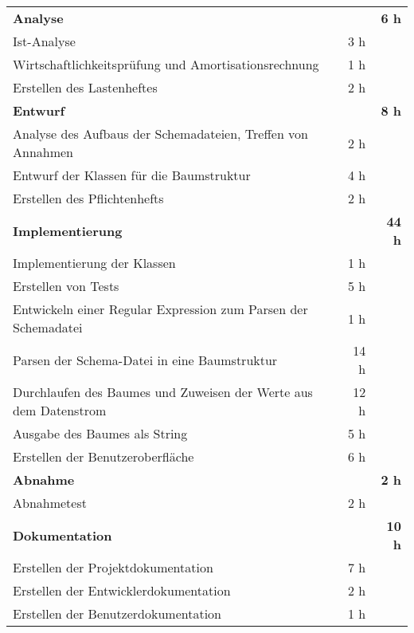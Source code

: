\begin{tabularx}{\textwidth}{Xrrr}
\rowcolor{heading}\textbf{Analyse} & \textbf{} & \textbf{} & \textbf{6 h} \\
Ist-Analyse & & 3 h\\
\rowcolor{odd}Wirtschaftlichkeitsprüfung und Amortisationsrechnung & & 1 h\\
Erstellen des Lastenheftes & & 2 h\\
\rowcolor{heading}\textbf{Entwurf} & \textbf{} & \textbf{} & \textbf{8 h} \\
Analyse des Aufbaus der Schemadateien, Treffen von Annahmen & & 2 h\\
\rowcolor{odd}Entwurf der Klassen für die Baumstruktur & & 4 h\\
Erstellen des Pflichtenhefts & & 2 h\\
\rowcolor{heading}\textbf{Implementierung} & \textbf{} & \textbf{} & \textbf{44 h} \\
Implementierung der Klassen  & & 1 h\\
\rowcolor{odd}Erstellen von Tests & & 5 h\\
Entwickeln einer Regular Expression zum Parsen der Schemadatei & & 1 h\\
\rowcolor{odd}Parsen der Schema-Datei in eine Baumstruktur & & 14 h\\
Durchlaufen des Baumes und Zuweisen der Werte aus dem Datenstrom & & 12 h\\
\rowcolor{odd}Ausgabe des Baumes als String & & 5 h\\
Erstellen der Benutzeroberfläche & & 6 h\\
\rowcolor{heading}\textbf{Abnahme} & \textbf{} & \textbf{} & \textbf{2 h} \\
Abnahmetest & & 2 h\\
\rowcolor{heading}\textbf{Dokumentation} & \textbf{} & \textbf{} & \textbf{10 h} \\
Erstellen der Projektdokumentation & & 7 h\\
\rowcolor{odd}Erstellen der Entwicklerdokumentation & & 2 h\\
Erstellen der Benutzerdokumentation & & 1 h\\
\end{tabularx}